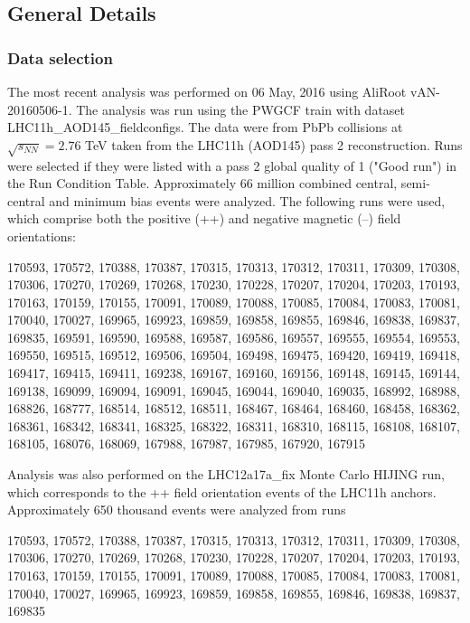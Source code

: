 \subsection{General Details}
\label{sec:GeneralDetails}

\subsubsection{Data selection}
\label{sec:DataSelection}
The most recent analysis was performed on 06 May, 2016 using AliRoot vAN-20160506-1.
The analysis was run using the PWGCF train with dataset LHC11h\_AOD145\_fieldconfigs.
The data were from PbPb collisions at $\sqrt{s_{NN}}=2.76$  TeV taken from the LHC11h (AOD145) pass 2 reconstruction. 
Runs were selected if they were listed with a pass 2 global quality of 1 ("Good run") in the Run Condition Table. 
Approximately 66 million combined central, semi-central and minimum bias events were analyzed. 
The following runs were used, which comprise both the positive (++) and negative magnetic (--) field orientations:

170593, 170572, 170388, 170387, 170315, 170313, 170312, 170311, 170309, 170308, 170306, 170270, 170269, 170268, 170230, 170228, 170207, 170204, 170203, 170193, 170163, 170159, 170155, 170091, 170089, 170088, 170085, 170084, 170083, 170081, 170040, 170027, 169965, 169923, 169859, 169858, 169855, 169846, 169838, 169837, 169835, 169591, 169590, 169588, 169587, 169586, 169557, 169555, 169554, 169553, 169550, 169515, 169512, 169506, 169504, 169498, 169475, 169420, 169419, 169418, 169417, 169415, 169411, 169238, 169167, 169160, 169156, 169148, 169145, 169144, 169138, 169099, 169094, 169091, 169045, 169044, 169040, 169035, 168992, 168988, 168826, 168777, 168514, 168512, 168511, 168467, 168464, 168460, 168458, 168362, 168361, 168342, 168341, 168325, 168322, 168311, 168310, 168115, 168108, 168107, 168105, 168076, 168069, 167988, 167987, 167985, 167920, 167915

Analysis was also performed on the LHC12a17a\_fix Monte Carlo HIJING run, which corresponds to the ++ field orientation events of the LHC11h anchors.  
Approximately 650 thousand events were analyzed from runs

170593, 170572, 170388, 170387, 170315, 170313, 170312, 170311, 170309, 170308, 170306, 170270, 170269, 170268, 170230, 170228, 170207, 170204, 170203, 170193, 170163, 170159, 170155, 170091, 170089, 170088, 170085, 170084, 170083, 170081, 170040, 170027, 169965, 169923, 169859, 169858, 169855, 169846, 169838, 169837, 169835

